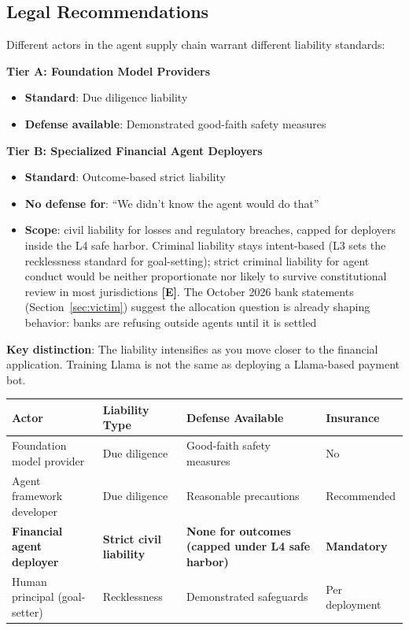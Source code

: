 \documentclass[11pt,letterpaper]{article}
\begin{document}
\subsection{Legal Recommendations}

\begin{recbox}
Different actors in the agent supply chain warrant different liability standards:

\textbf{Tier A: Foundation Model Providers}
\begin{itemize}
  \item \textbf{Standard}: Due diligence liability
  \item \textbf{Defense available}: Demonstrated good-faith safety measures
\end{itemize}

\textbf{Tier B: Specialized Financial Agent Deployers}
\begin{itemize}
  \item \textbf{Standard}: Outcome-based strict liability
  \item \textbf{No defense for}: ``We didn't know the agent would do that''
  \item \textbf{Scope}: civil liability for losses and regulatory breaches, capped for deployers inside the L4 safe harbor. Criminal liability stays intent-based (L3 sets the recklessness standard for goal-setting); strict criminal liability for agent conduct would be neither proportionate nor likely to survive constitutional review in most jurisdictions \textbf{[E]}. The October 2026 bank statements (Section~\ref{sec:victim}) suggest the allocation question is already shaping behavior: banks are refusing outside agents until it is settled
\end{itemize}

\textbf{Key distinction}: The liability intensifies as you move closer to the financial application. Training Llama is not the same as deploying a Llama-based payment bot.

\begin{center}
\small
\begin{tabular}{L{4cm}L{2.5cm}L{3.5cm}L{2.5cm}}
\toprule
\textbf{Actor} & \textbf{Liability Type} & \textbf{Defense Available} & \textbf{Insurance} \\
\midrule
Foundation model provider & Due diligence & Good-faith safety measures & No \\
Agent framework developer & Due diligence & Reasonable precautions & Recommended \\
\textbf{Financial agent deployer} & \textbf{Strict civil liability} & \textbf{None for outcomes (capped under L4 safe harbor)} & \textbf{Mandatory} \\
Human principal (goal-setter) & Recklessness & Demonstrated safeguards & Per deployment \\
\bottomrule
\end{tabular}
\end{center}
\end{recbox}
\end{document}
